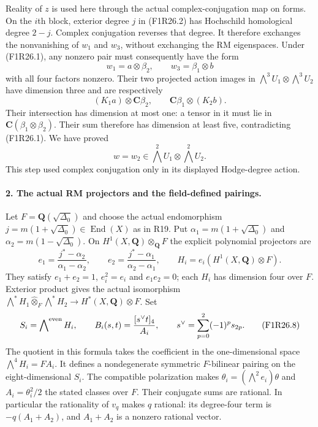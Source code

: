 Reality of $z$ is used here through the actual
complex-conjugation map on forms. On the $i$th
block, exterior degree $j$ in (F1R26.2) has
Hochschild homological degree $2-j$. Complex
conjugation reverses that degree. It therefore
exchanges the nonvanishing of $w_1$ and $w_3$,
without exchanging the RM eigenspaces.
Under (F1R26.1), any nonzero pair must consequently
have the form
\[
                   w_1=a\otimes\beta_2,\qquad
                   w_3=\beta_1\otimes b
 \tag{F1R26.4}
\]
with all four factors nonzero. Their two projected
action images in
$\bigwedge^3U_1\otimes\bigwedge^3U_2$ have dimension
three and are respectively
\[
              (K_1a)\otimes\mathbf C\beta_2,\qquad
                      \mathbf C\beta_1\otimes(K_2b).
 \tag{F1R26.5}
\]
Their intersection has dimension at most one:
a tensor in it must lie in
$\mathbf C(\beta_1\otimes\beta_2)$.
Their sum therefore has dimension at least five,
contradicting (F1R26.1). We have proved
\[
                        w=w_2\in
                             \bigwedge^2U_1\otimes\bigwedge^2U_2.
 \tag{F1R26.6}
\]
This step used complex conjugation only in its
displayed Hodge-degree action.

\paragraph{2. The actual RM projectors and the field-defined pairings.}
Let $F=\mathbf Q(\sqrt{\Delta_0})$ and choose the
actual endomorphism
$j=m(1+\sqrt{\Delta_0})\in\operatorname{End}(X)$
as in R19. Put
$\alpha_1=m(1+\sqrt{\Delta_0})$ and
$\alpha_2=m(1-\sqrt{\Delta_0})$.
On $H^1(X,\mathbf Q)\otimes_{\mathbf Q}F$ the
explicit polynomial projectors are
\[
 e_1=\frac{j^*-\alpha_2}{\alpha_1-\alpha_2},
       \qquad
 e_2=\frac{j^*-\alpha_1}{\alpha_2-\alpha_1},
       \qquad H_i=e_i(H^1(X,\mathbf Q)\otimes F).
 \tag{F1R26.7}
\]
They satisfy $e_1+e_2=1$, $e_i^2=e_i$ and
$e_1e_2=0$; each $H_i$ has dimension four over $F$.
Exterior product gives the actual isomorphism
$\bigwedge^*H_1\widehat\otimes_F\bigwedge^*H_2
\to H^*(X,\mathbf Q)\otimes F$.
Set
\[
 S_i=\bigwedge\nolimits^{\rm even}H_i,\qquad
 B_i(s,t)=\frac{[s^\vee t]_4}{A_i},\qquad
 s^\vee=\sum_{p=0}^2(-1)^p s_{2p}.
 \tag{F1R26.8}
\]
The quotient in this formula takes the coefficient
in the one-dimensional space $\bigwedge^4H_i=F A_i$.
It defines a nondegenerate symmetric $F$-bilinear
pairing on the eight-dimensional $S_i$.
The compatible polarization makes
$\theta_i=(\bigwedge^2e_i)\theta$ and
$A_i=\theta_i^2/2$ the stated classes over $F$.
Their conjugate sums are rational. In particular
the rationality of $v_q$ makes $q$ rational:
its degree-four term is $-q(A_1+A_2)$, and
$A_1+A_2$ is a nonzero rational vector.


